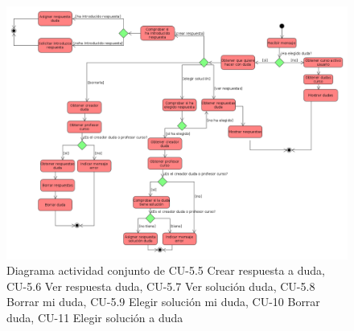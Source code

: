         \begin{figure}[H] %
\centering
\includegraphics[scale=0.2]{imagenes/diagramas/actividad/operaciones_dudaa.png}  %

\caption{Diagrama actividad conjunto de  CU-5.5 Crear respuesta a duda, CU-5.6 Ver respuesta duda, CU-5.7 Ver solución duda, CU-5.8 Borrar mi duda, CU-5.9 Elegir solución mi duda, CU-10 Borrar duda, CU-11 Elegir solución a duda}\label{figura151}
\end{figure}

